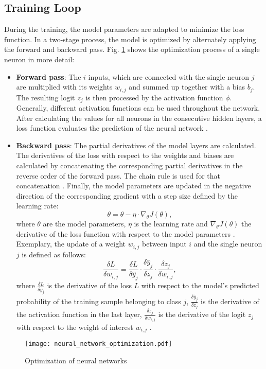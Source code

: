 \subsection{Training Loop}
During the training, the model parameters are adapted to minimize the loss function. In a two-stage process, the model is optimized by alternately applying the forward and backward pass. Fig.  \ref{fig:neural_network_optimization} shows the optimization process of a single neuron in more detail:
\begin{itemize}
    \item \textbf{Forward pass}: The $i$ inputs, which are connected with the single neuron $j$ are multiplied with its weights $w_{i,j}$ and summed up together with a bias $b_{j}$. The resulting logit $z_{j}$ is then processed by the activation function $\phi$. Generally, different activation functions can be used throughout the network. After calculating the values for all neurons in the consecutive hidden layers, a loss function evaluates the prediction of the neural network \cite{AN201942}.
    \item \textbf{Backward pass}: 
    The partial derivatives of the model layers are calculated. The derivatives of the loss with respect to the weights and biases are calculated by concatenating the corresponding partial derivatives in the reverse order of the forward pass. The chain rule is used for that concatenation \cite{ShilohPerl2020}. Finally, the model parameters are updated in the negative direction of the corresponding gradient with a step size defined by the learning rate:
    \begin{equation}
        \theta = \theta - \eta \cdot {\nabla}_{\theta}J(\theta),
    \end{equation}
    where $\theta$ are the model parameters, $\eta$ is the learning rate and ${\nabla}_{\theta}J(\theta)$ the derivative of the loss function with respect to the model parameters \cite{Lydia2019}. Exemplary, the update of a weight $w_{i,j}$ between input $i$ and the single neuron $j$ is defined as follows:
    \begin{equation}
     \frac{\delta L}{\delta w_{i,j}} = \frac{\delta L}{\delta \hat{y}_{j}} \cdot \frac{\delta \hat{y}_{j}}{\delta z_{j}} \cdot \frac{\delta z_{j}}{\delta w_{i,j}}, 
     \label{chain_rule}
    \end{equation}
where $\frac{\delta L}{\delta \hat{y}_{j}}$ is the derivative of the loss $L$ with respect to the model's predicted probability of the training sample belonging to class $j$, $\frac{\delta \hat{y}_{j}}{\delta z_{j}}$ is the derivative of the activation function in the last layer, $ \frac{\delta z_{j}}{\delta w_{i,j}}$ is the derivative of the logit $z_{j}$ with respect to the weight of interest $w_{i,j}$ \cite{ShilohPerl2020}. 
\end{itemize}
\begin{figure}[H]
  \centering
  \texttt{[image: neural\_network\_optimization.pdf]}
  \caption {Optimization of neural networks}
  \label{fig:neural_network_optimization}
\end{figure}

